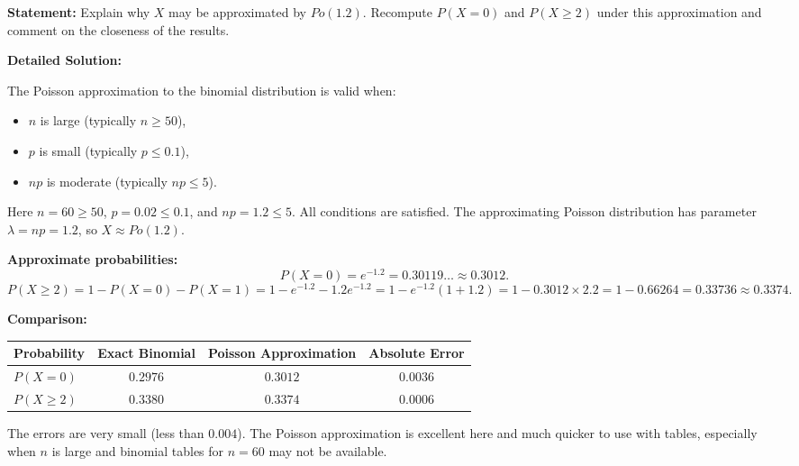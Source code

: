 \documentclass[11pt]{article}
\begin{document}
\begin{exoresolu}
\textbf{Statement:} Explain why $X$ may be approximated by $Po(1.2)$. Recompute $P(X=0)$ and $P(X \geq 2)$ under this approximation and comment on the closeness of the results.

\tcblower
\textbf{Detailed Solution:}

The Poisson approximation to the binomial distribution is valid when:
\begin{itemize}
\item $n$ is large (typically $n \geq 50$),
\item $p$ is small (typically $p \leq 0.1$),
\item $np$ is moderate (typically $np \leq 5$).
\end{itemize}
Here $n = 60 \geq 50$, $p = 0.02 \leq 0.1$, and $np = 1.2 \leq 5$. All conditions are satisfied. The approximating Poisson distribution has parameter $\lambda = np = 1.2$, so $X \approx Po(1.2)$.

\textbf{Approximate probabilities:}
\[
P(X = 0) = e^{-1.2} = 0.30119\ldots \approx 0.3012.
\]
\[
P(X \geq 2) = 1 - P(X=0) - P(X=1) = 1 - e^{-1.2} - 1.2 e^{-1.2} = 1 - e^{-1.2}(1 + 1.2) = 1 - 0.3012 \times 2.2 = 1 - 0.66264 = 0.33736 \approx 0.3374.
\]

\textbf{Comparison:}
\begin{center}
\begin{tabular}{|l|c|c|c|}
\hline
\rowcolor{popblueL} Probability & Exact Binomial & Poisson Approximation & Absolute Error \\
\hline
$P(X=0)$ & $0.2976$ & $0.3012$ & $0.0036$ \\
\hline
$P(X \geq 2)$ & $0.3380$ & $0.3374$ & $0.0006$ \\
\hline
\end{tabular}
\end{center}

The errors are very small (less than $0.004$). The Poisson approximation is excellent here and much quicker to use with tables, especially when $n$ is large and binomial tables for $n=60$ may not be available.
\end{exoresolu}
\end{document}
